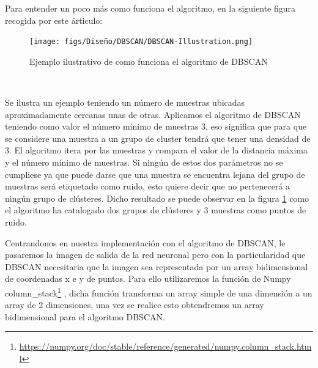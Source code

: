Para entender un poco más como funciona el algoritmo, en la siguiente figura recogida por este árticulo\cite{DBSCAN}: 

\begin{figure} [H]
  \begin{center}
    \texttt{[image: figs/Diseño/DBSCAN/DBSCAN-Illustration.png]}
  \end{center}
  \caption{Ejemplo ilustrativo de como funciona el algoritmo de DBSCAN}
  \label{fig:pesos_preentrenados}
\end{figure}\

Se ilustra un ejemplo teniendo un número de muestras ubicadas aproximadamente cercanas unas de otras. Aplicamos el algoritmo de DBSCAN 
teniendo como valor el número mínimo de muestras 3, eso significa que para que se considere una muestra a un grupo de cluster tendrá que tener una densidad de 3. El algoritmo itera por
las muestras y compara el valor de la distancia máxima y el número mínimo de muestras. 
Si ningún de estos dos parámetros no se cumpliese ya que puede darse que una muestra se encuentra lejana del grupo de muestras será etiquetado como ruido, esto quiere decir
que no pertenecerá a ningún grupo de clústeres. Dicho resultado se puede observar en la figura \ref{fig:pesos_preentrenados} como el algoritmo ha catalogado dos grupos de clústeres y 3 muestras
como puntos de ruido. 
\break

Centrandonos en nuestra implementación con el algoritmo de DBSCAN, le pasaremos la imagen de salida de la red neuronal pero con la particularidad que DBSCAN necesitaria que la imagen sea
representada por un array bidimensional de coordenadas x e y de puntos. Para ello utilizaremos la función de Numpy column\_stack\footnote{\url{https://numpy.org/doc/stable/reference/generated/numpy.column_stack.html}} , 
dicha función transforma un array simple de una dimensión a un array de 2 dimensiones, una vez se realice esto obtendremos un array bidimensional para el algoritmo DBSCAN.\newline

